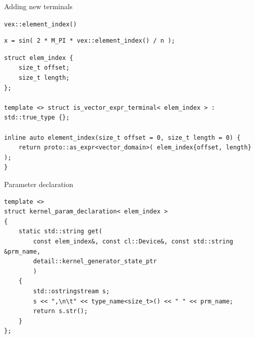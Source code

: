 \documentclass[@BEAMER_OPTIONS@]{beamer}
\newcommand{\code}[1]{\lstinline|#1|}
\begin{document}
\begin{frame}[fragile]{Adding new terminals}
    \begin{exampleblock}{\code{vex::element_index()}}
        \begin{lstlisting}
x = sin( 2 * M_PI * vex::element_index() / n );
        \end{lstlisting}
    \end{exampleblock}
    \begin{exampleblock}{}
        \begin{lstlisting}
struct elem_index {
    size_t offset;
    size_t length;
};

template <> struct is_vector_expr_terminal< elem_index > : std::true_type {};

inline auto element_index(size_t offset = 0, size_t length = 0) {
    return proto::as_expr<vector_domain>( elem_index{offset, length} );
}
        \end{lstlisting}
    \end{exampleblock}
\end{frame}

\note{ }

\begin{frame}[fragile]{Parameter declaration}
    \begin{exampleblock}{}
        \begin{lstlisting}
template <>
struct kernel_param_declaration< elem_index >
{
    static std::string get(
        const elem_index&, const cl::Device&, const std::string &prm_name,
        detail::kernel_generator_state_ptr
        )
    {
        std::ostringstream s;
        s << ",\n\t" << type_name<size_t>() << " " << prm_name;
        return s.str();
    }
};
        \end{lstlisting}
    \end{exampleblock}
\end{frame}

\note{ }
\end{document}
